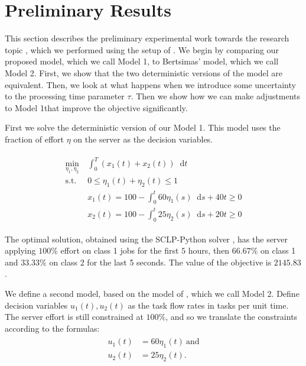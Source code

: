 \documentclass[11pt,a4paper,titlepage]{article}
\newcommand*{\dd}{\ensuremath{\mathop{}\!\mathrm{d}}}%
\theoremstyle{definition}
\theoremstyle{plain}
\begin{document}
    \section{Preliminary Results}
    \label{sec:results}

    \newcommand{\modelone}{Model 1}
    \newcommand{\modeltwo}{Model 2}

    This section describes the preliminary experimental work towards the research topic ,
    which we performed using the setup of .
    We begin by comparing our proposed model,
    which we call \modelone,
    to Bertsimas' model,
    which we call \modeltwo.
    First, we show that the two deterministic versions of the model are equivalent.
    Then,
    we look at what happens when we introduce some uncertainty to the processing time parameter $\tau$.
    Then we show how we can make adjustments to \modelone that improve the objective significantly.


    First we solve the deterministic version of our \modelone.
    This model uses the fraction of effort $\eta$ on the server as the decision variables.

    \begin{align}
        \label{eq:model-1}
        \begin{split}
            \min\limits_{\eta_1, \eta_2}
            &~ \int_0^T \left( x_1(t) + x_2(t) \right) \dd t \\
            \text{s.t.}
            &~ 0 \leq \eta_1(t) + \eta_2(t) \leq 1 \\
            &~ x_1(t) = 100 - \int_0^t 60 \eta_1(s) \dd s + 40t \geq 0 \\
            &~ x_2(t) = 100 - \int_0^t 25 \eta_2(s) \dd s + 20t \geq 0
        \end{split}
    \end{align}

    The optimal solution,
    obtained using the SCLP-Python solver \autocite{Shindin_SCLPPython_2021},
    has the server applying $100\%$ effort on class 1 jobs for the first $5$ hours,
    then $66.67\%$ on class 1 and 33.33\% on class 2 for the last 5 seconds.
    The value of the objective is $2145.83$.

    We define a second model,
    based on the model of \autocite{bertsimas2014robust},
    which we call \modeltwo.
    Define  decision variables $u_1(t), u_2(t)$ as the task flow rates
    in tasks per unit time.
    The server effort is still constrained at $100\%$,
    and so we translate the constraints according to the formulas:
    \begin{align}
        \label{eq:model-2-translation}
        \begin{split}
            u_1(t) & = 60 \eta_1(t) ~ \text{and} \\
            u_2(t) & = 25 \eta_2(t).
        \end{split}
    \end{align}
\end{document}
